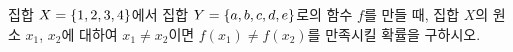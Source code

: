 집합 $X=\{1{,}\mkern3mu\mathopen{}2{,}\mkern3mu\mathopen{}3{,}\mkern3mu\mathopen{}4\}$에서 집합 $Y=\{a{,}\mkern3mu\mathopen{}b{,}\mkern3mu\mathopen{}c{,}\mkern3mu\mathopen{}d{,}\mkern3mu\mathopen{}e\}$로의 함수 $f$를 만들 때, 집합 $X$의 원소 $x_1$, $x_2$에 대하여 $x_1\ne x_2$이면 $f(x_1)\ne f(x_2)$를 만족시킬 확률을 구하시오.
